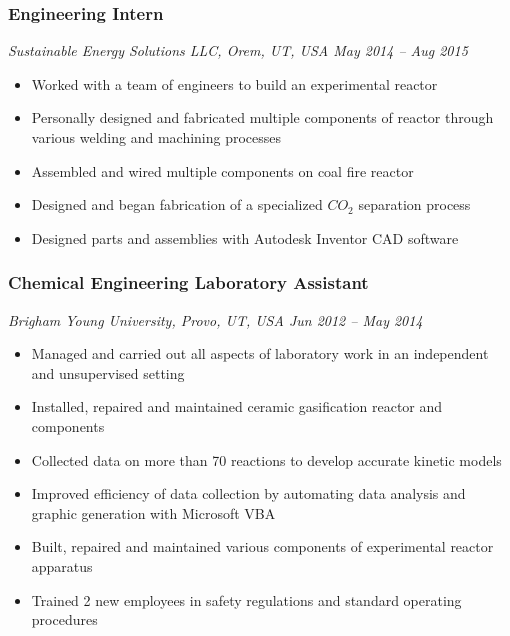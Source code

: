 \hypertarget{engineering-intern}{%
\subsubsection{Engineering Intern}\label{engineering-intern}}

\emph{Sustainable Energy Solutions LLC, Orem, UT, USA \textbar{} May
2014 -- Aug 2015}

\begin{itemize}
\tightlist
\item
  Worked with a team of engineers to build an experimental reactor
\item
  Personally designed and fabricated multiple components of reactor
  through various welding and machining processes
\item
  Assembled and wired multiple components on coal fire reactor
\item
  Designed and began fabrication of a specialized \(CO_2\) separation
  process
\item
  Designed parts and assemblies with Autodesk Inventor CAD software
\end{itemize}

\hypertarget{chemical-engineering-laboratory-assistant}{%
\subsubsection{Chemical Engineering Laboratory
Assistant}\label{chemical-engineering-laboratory-assistant}}

\emph{Brigham Young University, Provo, UT, USA \textbar{} Jun 2012 --
May 2014}

\begin{itemize}
\tightlist
\item
  Managed and carried out all aspects of laboratory work in an
  independent and unsupervised setting
\item
  Installed, repaired and maintained ceramic gasification reactor and
  components
\item
  Collected data on more than 70 reactions to develop accurate kinetic
  models
\item
  Improved efficiency of data collection by automating data analysis and
  graphic generation with Microsoft VBA
\item
  Built, repaired and maintained various components of experimental
  reactor apparatus
\item
  Trained 2 new employees in safety regulations and standard operating
  procedures
\end{itemize}

